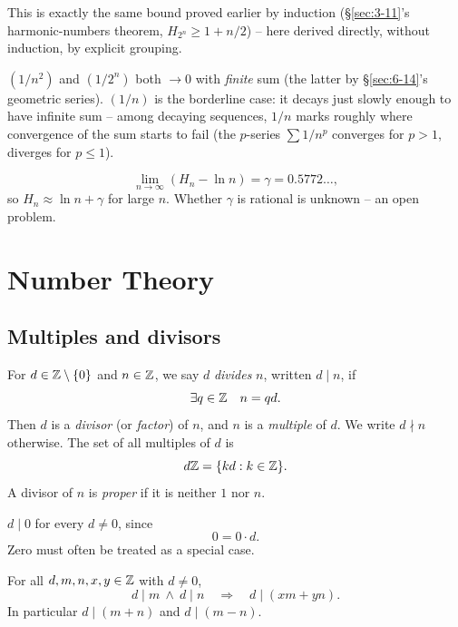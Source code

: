 \documentclass[11pt]{article}
\begin{document}
\begin{note}
This is exactly the same bound proved earlier by induction (\S\ref{sec:3-11}'s harmonic-numbers theorem, $H_{2^n}\ge1+n/2$) -- here derived directly, without induction, by explicit grouping.
\end{note}

\begin{note}
$(1/n^2)$ and $(1/2^n)$ both $\to0$ with \emph{finite} sum (the latter by \S\ref{sec:6-14}'s geometric series). $(1/n)$ is the borderline case: it decays just slowly enough to have infinite sum -- among decaying sequences, $1/n$ marks roughly where convergence of the sum starts to fail (the $p$-series $\sum1/n^p$ converges for $p>1$, diverges for $p\le1$).
\end{note}

\begin{note}
\[
\lim_{n\to\infty}(H_n-\ln n) = \gamma = 0.5772\dots,
\]
so $H_n \approx \ln n+\gamma$ for large $n$. Whether $\gamma$ is rational is unknown -- an open problem.
\end{note}

\newpage

\section{Number Theory}
\label{sec:numbertheory}

\subsection{Multiples and divisors}
\label{sec:divisors}

\begin{definition}[Divisibility]
For $d\in\mathbb{Z}\setminus\{0\}$ and $n\in\mathbb{Z}$, we say $d$ \emph{divides} $n$, written $d\mid n$, if
\[
\exists q\in\mathbb{Z}\quad n=qd.
\]
Then $d$ is a \emph{divisor} (or \emph{factor}) of $n$, and $n$ is a \emph{multiple} of $d$. We write $d\nmid n$ otherwise. The set of all multiples of $d$ is
\[
d\mathbb{Z}=\{kd : k\in\mathbb{Z}\}.
\]
A divisor of $n$ is \emph{proper} if it is neither $1$ nor $n$.
\end{definition}

\begin{note}
$d\mid 0$ for every $d\ne 0$, since
\[
0=0\cdot d.
\]
Zero must often be treated as a special case.
\end{note}

\begin{theorem}
\label{thm:divlinear}
For all $d,m,n,x,y\in\mathbb{Z}$ with $d\ne0$,
\[
d\mid m \ \wedge\ d\mid n \quad\Longrightarrow\quad d\mid (xm+yn).
\]
In particular $d\mid(m+n)$ and $d\mid(m-n)$.
\end{theorem}
\end{document}
